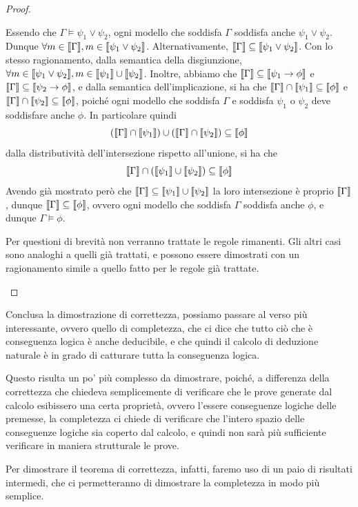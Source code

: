\begin{proof}
\begin{description}
    Essendo che \(\Gamma\models \psi_1 \lor \psi_2\), ogni modello che soddisfa \(\Gamma\) soddisfa anche \(\psi_1\lor\psi_2\). Dunque \(\forall m \in \den{\Gamma}, m \in \den{\psi_1\lor\psi_2}\). Alternativamente, \(\den{\Gamma}\subseteq \den{\psi_1\lor\psi_2}\). Con lo stesso ragionamento, dalla semantica della disgiunzione, \(\forall m \in \den{\psi_1\lor\psi_2}, m \in \den{\psi_1}\cup \den{\psi_2}\). Inoltre, abbiamo che \(\den{\Gamma}\subseteq\den{\psi_1\to\phi}\) e \(\den{\Gamma}\subseteq\den{\psi_2\to\phi}\), e dalla semantica dell'implicazione, si ha che \(\den{\Gamma} \cap \den{\psi_1}\subseteq\den{\phi}\) e \(\den{\Gamma}\cap\den{\psi_2}\subseteq\den{\phi}\), poiché ogni modello che soddisfa \(\Gamma\) e soddisfa \(\psi_1\) o \(\psi_2\) deve soddisfare anche \(\phi\). In particolare quindi
    \[(\den{\Gamma}\cap\den{\psi_1})\cup(\den{\Gamma}\cap\den{\psi_2})\subseteq \den{\phi}\]
    dalla distributività dell'intersezione rispetto all'unione, si ha che
    \[\den{\Gamma} \cap (\den{\psi_1}\cup\den{\psi_2})\subseteq\den{\phi}\]
    Avendo già mostrato però che \(\den{\Gamma} \subseteq \den{\psi_1}\cup\den{\psi_2}\) la loro intersezione è proprio \(\den{\Gamma}\),
    dunque \(\den{\Gamma}\subseteq \den{\phi}\), ovvero ogni modello che soddisfa \(\Gamma\) soddisfa anche \(\phi\), e dunque \(\Gamma\models\phi\).
    \item[] Per questioni di brevità non verranno trattate le regole rimanenti. Gli altri casi sono analoghi a quelli già trattati, e possono essere dimostrati con un ragionamento simile a quello fatto per le regole già trattate.
  \end{description}
\end{proof}

Conclusa la dimostrazione di correttezza, possiamo passare al verso più interessante, ovvero quello di completezza, che ci dice che tutto ciò che è conseguenza logica è anche deducibile, e che quindi il calcolo di deduzione naturale è in grado di catturare tutta la conseguenza logica.

Questo risulta un po' più complesso da dimostrare, poiché, a differenza della correttezza che chiedeva semplicemente di verificare che le prove generate dal calcolo esibissero una certa proprietà, ovvero l'essere conseguenze logiche delle premesse, la completezza ci chiede di verificare che l'intero spazio delle conseguenze logiche sia coperto dal calcolo, e quindi non sarà più sufficiente verificare in maniera strutturale le prove.

Per dimostrare il teorema di correttezza, infatti, faremo uso di un paio di risultati intermedi, che ci permetteranno di dimostrare la completezza in modo più semplice.


